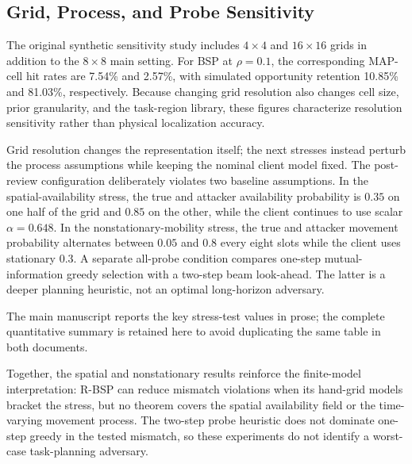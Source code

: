 \documentclass[10pt,journal,compsoc]{IEEEtran}
\begin{document}
\subsection{Grid, Process, and Probe Sensitivity}
The original synthetic sensitivity study includes $4\times4$ and $16\times16$ grids in addition to the $8\times8$ main setting. For BSP at $\rho=0.1$, the corresponding MAP-cell hit rates are 7.54\% and 2.57\%, with simulated opportunity retention 10.85\% and 81.03\%, respectively. Because changing grid resolution also changes cell size, prior granularity, and the task-region library, these figures characterize resolution sensitivity rather than physical localization accuracy.
\begin{table}[t]
\centering\small
\caption{Grid-resolution sensitivity for synthetic BSP at $\rho=0.1$. These rows are diagnostics because the task-region library changes with the grid.}
\label{tab:grid-sensitivity}

\end{table}

Grid resolution changes the representation itself; the next stresses instead perturb the process assumptions while keeping the nominal client model fixed. The post-review configuration deliberately violates two baseline assumptions. In the spatial-availability stress, the true and attacker availability probability is $0.35$ on one half of the grid and $0.85$ on the other, while the client continues to use scalar $\alpha=0.648$. In the nonstationary-mobility stress, the true and attacker movement probability alternates between $0.05$ and $0.8$ every eight slots while the client uses stationary $0.3$. A separate all-probe condition compares one-step mutual-information greedy selection with a two-step beam look-ahead. The latter is a deeper planning heuristic, not an optimal long-horizon adversary.

The main manuscript reports the key stress-test values in prose; the complete quantitative summary is retained here to avoid duplicating the same table in both documents.

\begin{table}[t]
\centering\small
\caption{Targeted post-review stress tests at $\rho=0.1$. Local-cap violations are evaluated under the attacker's model. Opportunity retention is undefined in all-probe rows.}

\end{table}

Together, the spatial and nonstationary results reinforce the finite-model interpretation: R-BSP can reduce mismatch violations when its hand-grid models bracket the stress, but no theorem covers the spatial availability field or the time-varying movement process. The two-step probe heuristic does not dominate one-step greedy in the tested mismatch, so these experiments do not identify a worst-case task-planning adversary.
\end{document}
